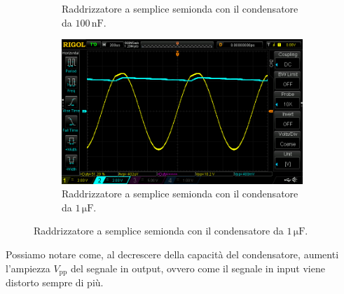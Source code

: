 \documentclass[a4paper]{article}
\begin{document}
\begin{figure}[h!]
\begin{subfigure}{0.4\textwidth}
						\caption{Raddrizzatore a semplice semionda con il condensatore da $ 100 \, \mathrm{nF} $.}
					\end{subfigure}
					\begin{subfigure}{1\textwidth}
						\centering
						\includegraphics[scale=0.4]{raddrizzatoreASempliceSemiondaDiodo1micro}
						\caption{Raddrizzatore a semplice semionda con il condensatore da $ 1 \, \mathrm{\mu F} $.}
					\end{subfigure}
					\label{fig:raddrizzatoreASempliceSemiondaDiodo}
				\end{figure}
				\newline
				Possiamo notare come, al decrescere della capacità del condensatore, aumenti l'ampiezza $ V_{\mathrm{pp}} $ del segnale in output, ovvero come il segnale in input viene distorto sempre di più.
\end{document}

